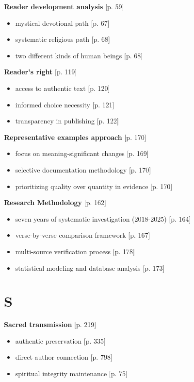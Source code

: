 \documentclass[11pt,twoside]{book}
\begin{document}
\textbf{\textbf{Reader development analysis}} {[}p. 59]
\begin{itemize}
\item mystical devotional path [p. 67]
\item systematic religious path [p. 68]
\item two different kinds of human beings [p. 68]
\end{itemize}

\textbf{\textbf{Reader's right}} {[}p. 119]
\begin{itemize}
\item access to authentic text [p. 120]
\item informed choice necessity [p. 121]
\item transparency in publishing [p. 122]
\end{itemize}

\textbf{\textbf{Representative examples approach}} {[}p. 170]
\begin{itemize}
\item focus on meaning-significant changes [p. 169]
\item selective documentation methodology [p. 170]
\item prioritizing quality over quantity in evidence [p. 170]
\end{itemize}

\textbf{\textbf{Research Methodology}} {[}p. 162]
\begin{itemize}
\item seven years of systematic investigation (2018-2025) [p. 164]
\item verse-by-verse comparison framework [p. 167]
\item multi-source verification process [p. 178]
\item statistical modeling and database analysis [p. 173]
\end{itemize}
\section*{S}
\label{sec:orgc215f7a}

\textbf{\textbf{Sacred transmission}} {[}p. 219]
\begin{itemize}
\item authentic preservation [p. 335]
\item direct author connection [p. 798]
\item spiritual integrity maintenance [p. 75]
\end{itemize}
\end{document}
